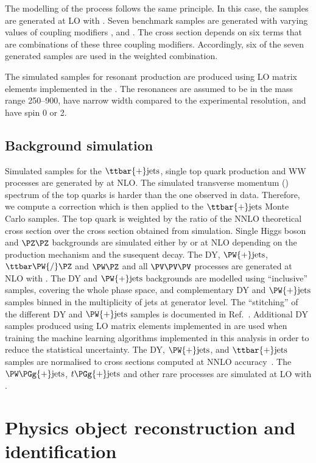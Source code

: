 The modelling of the \VBF process follows the same principle.
In this case, the samples are generated at LO with \MGvATNLO. Seven benchmark samples are generated with varying values of coupling modifiers \klambda, \CV and \CVV. The cross section depends on six terms that are combinations of these three coupling modifiers. Accordingly, six of the seven generated samples are used in the weighted combination.

The simulated samples for resonant \HH production are produced using LO matrix elements implemented in the \MGvATNLO. The resonances are assumed to be in the mass range 250--900\GeV, have narrow width compared to the experimental resolution, and have spin 0 or 2.

\subsection{Background simulation}
\label{sec:Bkgsimulation}
{Simulated samples for the $\ttbar{+}\text{jets}$, single top quark production and WW processes are generated by \POWHEG at NLO.
  The simulated transverse momentum (\pt) spectrum of the top quarks is harder than the one observed in data.
  Therefore, we compute a correction which is then applied to the $\ttbar{+}\text{jets}$ Monte Carlo samples.
  The top quark \pt is weighted by the ratio of the NNLO theoretical cross section over the cross section obtained from simulation.
  Single Higgs boson and $\PZ\PZ$ backgrounds are simulated either by \POWHEG or \MGvATNLO at NLO depending on the production mechanism and the susequent decay.
  The DY, $\PW{+}\text{jets}$,  $\ttbar\PW{/}\PZ$ and $\PW\PZ$ and all $\PV\PV\PV$ processes are generated at NLO with \MGvATNLO.
  The DY and $\PW{+}\text{jets}$ backgrounds are modelled using ``inclusive'' samples, covering the whole phase space, and complementary DY and $\PW{+}\text{jets}$ samples binned in the multiplicity of jets at generator level. The ``stitching'' of the different DY and $\PW{+}\text{jets}$ samples is documented in Ref.~\cite{Ehataht_2021rkh}. Additional DY samples produced using LO matrix elements implemented in \MGvATNLO are used when training the machine learning algorithms implemented in this analysis in order to reduce the statistical uncertainty. The DY, $\PW{+}\text{jets}$, and $\ttbar{+}\text{jets}$ samples are normalised to cross sections computed at NNLO accuracy~\cite{FEWZ,TTbarXsectionNNLO,Zcrosssection_2018}.
  The $\PW\PGg{+}\text{jets}$, $t\PGg{+}\text{jets}$  and other rare processes are simulated at LO with \MGvATNLO.}
\section{Physics object reconstruction and identification}
\label{reco}

